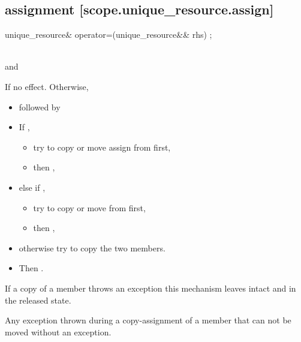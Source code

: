 \documentclass[ebook,11pt,article]{memoir}
\begin{document}
\subsection { assignment [scope.unique_resource.assign]}

\begin{itemdecl}
unique_resource& operator=(unique_resource&& rhs) ;
\end{itemdecl}

\begin{itemdescr}
\pnum
\requires \\
and\\

\pnum
\effects If  no effect. Otherwise,
\begin{itemize}
\item
{} followed by
\item  
If , 
\begin{itemize}
  \item try to copy or move assign  from  first,
  \item then , 
\end{itemize}
\item
else if  , 
\begin{itemize}
  \item try to copy or move  from  first,
  \item then , 
\end{itemize}
\item
otherwise try to copy the two members. 
\item Then . 
\end{itemize}
\begin{note}
If a copy of a member throws an exception this mechanism leaves  intact and  in the released state.
\end{note}

\pnum
\throws Any exception thrown during a copy-assignment of a member that can not be moved without an exception.
\end{itemdescr}
\end{document}
